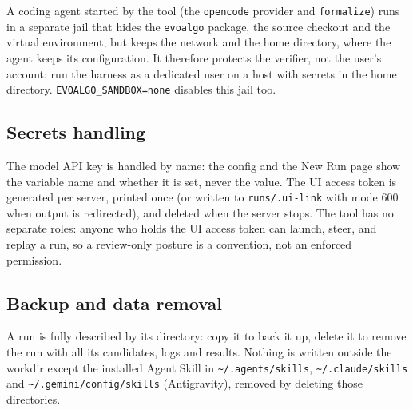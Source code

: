 A coding agent started by the tool (the \texttt{opencode} provider and
\texttt{formalize}) runs in a separate jail that hides the \texttt{evoalgo}
package, the source checkout and the virtual environment, but keeps the network
and the home directory, where the agent keeps its configuration. It therefore
protects the verifier, not the user's account: run the harness as a dedicated
user on a host with secrets in the home directory. \texttt{EVOALGO\_SANDBOX=none}
disables this jail too.

\subsection{Secrets handling}

The model API key is handled by name: the config and the New Run page show the
variable name and whether it is set, never the value. The UI
access token is generated per server, printed once (or written to
\texttt{runs/.ui-link} with mode 600 when output is redirected), and deleted
when the server stops. The tool has no separate roles: anyone who holds the UI
access token can launch, steer, and replay a run, so a review-only posture is a
convention, not an enforced permission.

\subsection{Backup and data removal}

A run is fully described by its directory: copy it to back it up, delete it to
remove the run with all its candidates, logs and results. Nothing is written
outside the workdir
except the installed Agent
Skill in \texttt{\textasciitilde/.agents/skills},
\texttt{\textasciitilde/.claude/skills} and
\texttt{\textasciitilde/.gemini/config/skills} (Antigravity), removed by
deleting those directories.
